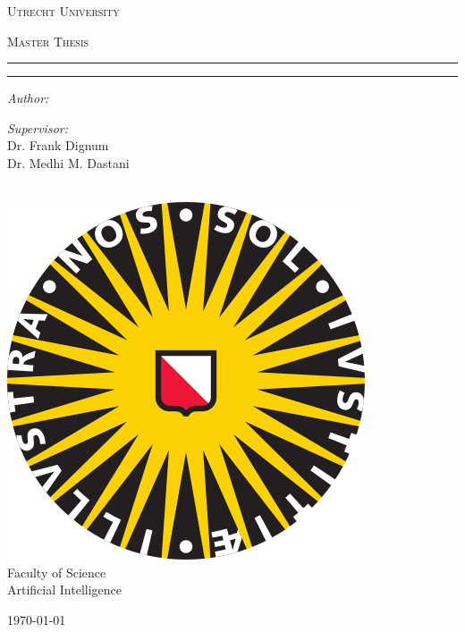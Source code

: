 \makeatletter
\begin{titlepage}
\begin{center}

\vspace*{.06\textheight}
{\scshape\LARGE Utrecht University\par}\vspace{1.5cm} %
\textsc{\Large Master Thesis}\\[0.5cm] %

\hrule
\vspace{0.2cm}
{\huge \bfseries \@title \par}
\vspace{0.4cm} %
\hrule
\vspace{0.2cm}

\begin{minipage}[t]{0.4\textwidth}
\begin{flushleft} \large
\emph{Author:}\\
\@author %
\end{flushleft}
\end{minipage}
\begin{minipage}[t]{0.4\textwidth}
\begin{flushright} \large
\emph{Supervisor:} \\
Dr. Frank Dignum \\
Dr. Medhi M. Dastani
\end{flushright}
\end{minipage}\\[1.5cm]
 
\includegraphics{logo} %
\\[1.0cm]

Faculty of Science \\
Artificial Intelligence\\[2cm] %
 
\vfill

{\large \today}\\[4cm] %
 
\vfill
\end{center}
\end{titlepage}

\renewcommand\listoffigures{%
        \@starttoc{lof}%
}

\renewcommand\listoftables{%
        \@starttoc{lot}%
}
\makeatother
